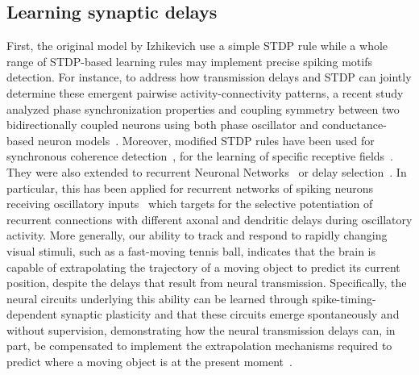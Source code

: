 \documentclass[brainsci, %
               review,submit,pdftex,moreauthors
               ]{Definitions/mdpi}
\begin{document}
% 
\subsection{Learning synaptic delays}
First, the original model by Izhikevich use a simple STDP rule while a whole range of STDP-based learning rules may implement precise spiking motifs detection. For instance, to address how transmission delays and STDP can jointly determine these emergent pairwise activity-connectivity patterns, a recent study analyzed phase synchronization properties and coupling symmetry between two bidirectionally coupled neurons using both phase oscillator and conductance-based neuron models~\citep{madadi_asl_delay-dependent_2022}. Moreover, modified STDP rules have been used for synchronous coherence detection~\citep{perrinet_coherence_2002}, for the learning of specific receptive fields~\citep{perrinet_networks_2001}. They were also extended to recurrent Neuronal Networks~\citep{gilson_stdp_2010} or delay selection~\citep{datadien_right_2011}. In particular, this has been applied for recurrent networks of spiking neurons receiving oscillatory inputs~\citep{kerr_delay_2013} which targets for the selective potentiation of recurrent connections with different axonal and dendritic delays during oscillatory activity. More generally, our ability to track and respond to rapidly changing visual stimuli, such as a fast-moving tennis ball, indicates that the brain is capable of extrapolating the trajectory of a moving object to predict its current position, despite the delays that result from neural transmission. Specifically, the neural circuits underlying this ability can be learned through spike-timing-dependent synaptic plasticity and that these circuits emerge spontaneously and without supervision, demonstrating how the neural transmission delays can, in part, be compensated to implement the extrapolation mechanisms required to predict where a moving object is at the present moment~\citep{burkitt_predictive_2021}.
\end{document}
